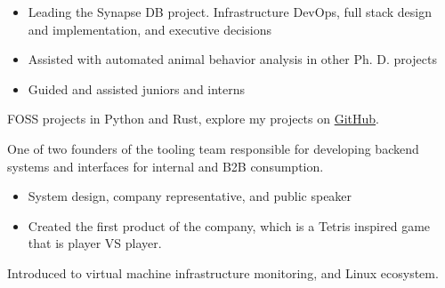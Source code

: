 \documentclass[10pt,a4paper,ragged2e,withhyper]{AltaCV/altacv}
\begin{document}
\begin{paracol}{2}


	\divider

		\begin{itemize}
			\item Leading the Synapse DB project. Infrastructure DevOps, full stack design and implementation, and executive decisions
			\item Assisted with automated animal behavior analysis in other Ph. D. projects
			\item Guided and assisted juniors and interns
		\end{itemize}

	\divider

		FOSS projects in Python and Rust, explore my projects on \href{https://github.com/caniko}{GitHub}.

	\divider

		One of two founders of the tooling team responsible for developing backend systems and interfaces for internal and B2B consumption.

	\divider

		\begin{itemize}
			\item System design, company representative, and public speaker
			\item Created the first product of the company, which is a Tetris inspired game that is player VS player.
		\end{itemize}

	\divider

		Introduced to virtual machine infrastructure monitoring, and Linux ecosystem.

\newpage


\end{paracol}
\end{document}
